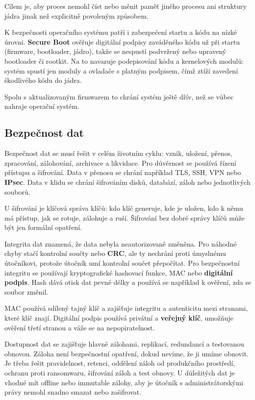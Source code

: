 \documentclass[11pt,a4paper]{article}
\begin{document}
Cílem je, aby proces nemohl číst nebo měnit paměť jiného procesu ani struktury jádra jinak než explicitně povoleným způsobem.

K bezpečnosti operačního systému patří i zabezpečení startu a kódu na nízké úrovni. \textbf{Secure Boot} ověřuje digitální podpisy zaváděného kódu už při startu (firmware, bootloader, jádro), takže se nespustí podvržený nebo upravený bootloader či rootkit. Na to navazuje podepisování kódu a kernelových modulů: systém spustí jen moduly a ovladače s platným podpisem, čímž ztíží zavedení škodlivého kódu do jádra.

Spolu s aktualizovaným firmwarem to chrání systém ještě dřív, než se vůbec nahraje operační systém.

\subsection*{Bezpečnost dat}

Bezpečnost dat se musí řešit v celém životním cyklu: vznik, uložení, přenos, zpracování, zálohování, archivace a likvidace. Pro důvěrnost se používá řízení přístupu a šifrování. Data v přenosu se chrání například TLS, SSH, VPN nebo \textbf{IPsec}. Data v klidu se chrání šifrováním disků, databází, záloh nebo jednotlivých souborů.

U šifrování je klíčová správa klíčů: kdo klíč generuje, kde je uložen, kdo k němu má přístup, jak se rotuje, zálohuje a ruší. Šifrování bez dobré správy klíčů může být jen formální opatření.

Integrita dat znamená, že data nebyla neautorizovaně změněna. Pro náhodné chyby stačí kontrolní součty nebo \textbf{CRC}, ale ty nechrání proti úmyslnému útočníkovi, protože útočník umí kontrolní součet přepočítat. Pro bezpečnostní integritu se používají kryptografické hashovací funkce, MAC nebo \textbf{digitální podpis}. Hash dává otisk dat pevné délky a používá se například k ověření, zda se soubor změnil.

MAC používá sdílený tajný klíč a zajišťuje integritu a autenticitu mezi stranami, které klíč znají. Digitální podpis používá privátní a \textbf{veřejný klíč}, umožňuje ověření třetí stranou a váže se na nepopiratelnost.

Dostupnost dat se zajišťuje hlavně zálohami, replikací, redundancí a testovanou obnovou. Záloha není bezpečnostní opatření, dokud nevíme, že ji umíme obnovit. Je třeba řešit pravidelnost, retenci, oddělení záloh od produkčního prostředí, ochranu proti ransomwaru, šifrování záloh a test obnovy. U důležitých dat je vhodné mít offline nebo immutable zálohy, aby je útočník s administrátorskými právy nemohl snadno smazat nebo zašifrovat.
\end{document}
